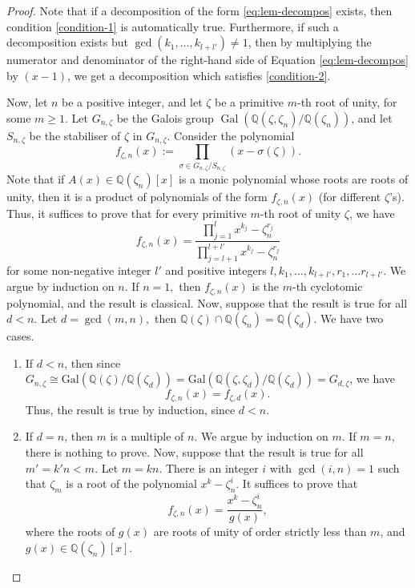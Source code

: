 \documentclass[11pt, reqno]{amsart}
\theoremstyle{plain}
\theoremstyle{definition}
\newcommand{\Q}{\mathbb{Q}}
\newcommand{\Gal}{\text{Gal}}
\begin{document}
\begin{proof}
Note that if a decomposition of the form \eqref{eq:lem-decompos} exists, then condition \eqref{condition-1} is automatically true. Furthermore, if such a decomposition exists but $\gcd(k_1,\dots, k_{l+l'})\neq 1$, then by multiplying the numerator and denominator of the right-hand side of Equation \eqref{eq:lem-decompos} by $(x-1)$, we get a decomposition which satisfies \eqref{condition-2}.

Now, let $n$ be a positive integer, and let $\zeta$ be a primitive $m$-th root of unity, for some $m\ge 1$.
Let $G_{n,\zeta}$ be the Galois group $ \operatorname{Gal}(\Q(\zeta,\zeta_n)/\Q(\zeta_n))$, and let $S_{n,\zeta}$ be the stabiliser of $\zeta$ in $G_{n,\zeta}$. 
Consider the polynomial 
\[
f_{\zeta,n}(x):=\prod_{\sigma \in G_{n,\zeta}/S_{n,\zeta}} (x- \sigma(\zeta)).
\]
Note that if $A(x) \in \Q(\zeta_n)[x]$ is a monic polynomial whose roots are roots of unity, then it is a product of polynomials of the form 
$f_{\zeta,n}(x)$ (for different $\zeta$'s). 
Thus, it suffices to prove that for every primitive $m$-th root of unity $\zeta$, we have
\[
f_{\zeta,n}(x)= \frac{\prod_{j=1}^{l} x^{k_j}-\zeta_n^{r_j}}{\prod_{j=l+1}^{l+l'} x^{k_j}-\zeta_n^{r_j}}
\]
for some non-negative integer $l'$ and positive integers $l, k_1,\dots, k_{l+l'}, r_1,\dots r_{l+l'}$.
We argue by induction on $n$.
If $n=1,$ then $f_{\zeta,n}(x)$ is the $m$-th cyclotomic polynomial, and the result is classical. Now, suppose that the result is true for all $d < n$.  Let $d= \gcd(m,n),$ then $\Q(\zeta) \cap \Q(\zeta_n) = \Q(\zeta_d)$. We have two cases.
\begin{enumerate}
    \item If $d<n$, then since $G_{n,\zeta} \cong \Gal(\Q(\zeta)/\Q(\zeta_d)) = \Gal(\Q(\zeta,\zeta_d)/\Q(\zeta_d))  = G_{d,\zeta}$, we have
    \[
    f_{\zeta,n}(x) = f_{\zeta,d}(x).
    \]
    Thus, the result is true by induction, since $d<n$.
    \item If $d=n$, then $m$ is a multiple of $n$.
    We argue by induction on $m$. If $m=n$, there is nothing to prove. Now, suppose that the result is true for all $m'=k'n <m$. 
    Let $m=kn$. There is an integer $i$ with $\gcd(i,n)=1$ such that $\zeta_m$ is a root of the polynomial $x^{k} - \zeta_n^i$. It suffices to prove that
    \begin{equation}\label{eq:proof-galois-stable}
    f_{\zeta,n}(x) = \frac{x^{k} - \zeta_n^i }{g(x)},
    \end{equation}
    where the roots of $g(x)$ are roots of unity of order strictly less than $m$, and $g(x) \in \Q(\zeta_n)[x]$. 

\end{enumerate}
\end{proof}
\end{document}
